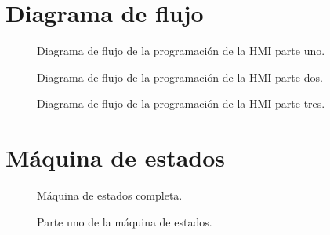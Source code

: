 \documentclass[11pt,tesis,twoside,openright,spanish]{upiiztt}
\begin{document}
\section*{Diagrama de flujo}

\begin{figure}[H]
  \centering
  \caption{Diagrama de flujo de la programación de la HMI parte uno.}
  \label{fig:flujo_hmi1}
\end{figure}

\begin{figure}[H]
  \centering
  \caption{Diagrama de flujo de la programación de la HMI parte dos.}
  \label{fig:flujo_hmi2}
\end{figure}

\begin{figure}[H]
  \centering
  \caption{Diagrama de flujo de la programación de la HMI parte tres.}
  \label{fig:flujo_hmi3}
\end{figure}

\section*{Máquina de estados}

\begin{figure}[H]
  \centering
  \caption{Máquina de estados completa.}
  \label{fig:maquina_estados}
\end{figure}

\begin{figure}[H]
  \centering
  \caption{Parte uno de la máquina de estados.}
  \label{fig:estados_p1}
\end{figure}
\end{document}
